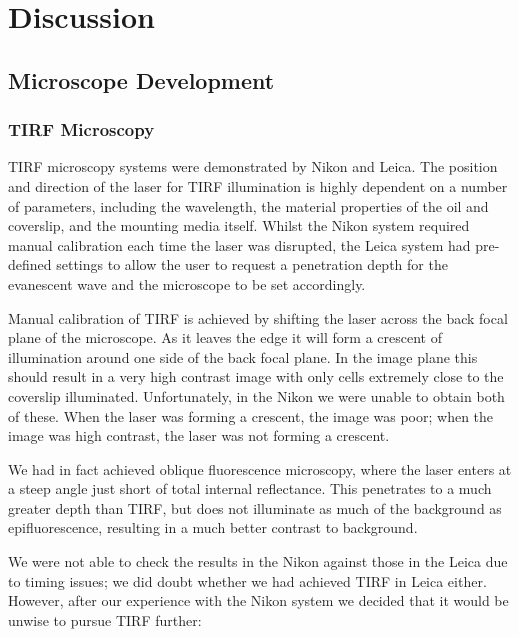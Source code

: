 \documentclass[../main.tex]{subfiles}
\begin{document}
\section{Discussion}

\subsection{Microscope Development}

\subsubsection{TIRF Microscopy}
TIRF microscopy systems were demonstrated by Nikon and Leica. The position and direction of the laser for TIRF illumination is highly dependent on a number of parameters, including the wavelength, the material properties of the oil and coverslip, and the mounting media itself. Whilst the Nikon system required manual calibration each time the laser was disrupted, the Leica system had pre-defined settings to allow the user to request a penetration depth for the evanescent wave and the microscope to be set accordingly.

Manual calibration of TIRF is achieved by shifting the laser across the back focal plane of the microscope. As it leaves the edge it will form a crescent of illumination around one side of the back focal plane. In the image plane this should result in a very high contrast image with only cells extremely close to the coverslip illuminated. Unfortunately, in the Nikon we were unable to obtain both of these. When the laser was forming a crescent, the image was poor; when the image was high contrast, the laser was not forming a crescent.

We had in fact achieved oblique fluorescence microscopy, where the laser enters at a steep angle just short of total internal reflectance. This penetrates to a much greater depth than TIRF, but does not illuminate as much of the background as epifluorescence, resulting in a much better contrast to background.

We were not able to check the results in the Nikon against those in the Leica due to timing issues; we did doubt whether we had achieved TIRF in Leica either. However, after our experience with the Nikon system we decided that it would be unwise to pursue TIRF further:
\end{document}
